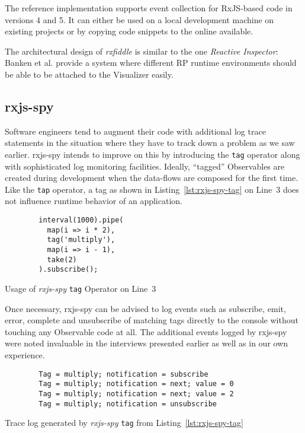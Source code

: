 \documentclass[12pt,a4paper]{article}
\begin{document}
The reference implementation supports event collection for RxJS-based code in versions 4 and 5. It can either be used on a local development machine on existing projects or by copying code snippets to the online available.

The architectural design of \emph{rxfiddle} is similar to the one \emph{Reactive Inspector}: Banken et al. provide a system where different RP runtime environments should be able to be attached to the Visualizer easily.

\subsection{rxjs-spy}

Software engineers tend to augment their code with additional log trace statements in the situation where they have to track down a problem as we saw earlier. rxjs-spy\cite{rxjsspy} intends to improve on this by introducing the \texttt{tag} operator along with sophisticated log monitoring facilities. Ideally, ``tagged'' Observables are created during development when the data-flows are composed for the first time. Like the \texttt{tap} operator, a tag as shown in Listing~\ref{lst:rxjs-spy-tag} on Line~3 does not influence runtime behavior of an application.

\begin{listing}[H]
	\begin{verbatim}
		interval(1000).pipe(
		  map(i => i * 2),
		  tag('multiply'),
		  map(i => i - 1),
		  take(2)
		).subscribe();
	\end{verbatim}
	\caption{Usage of \emph{rxjs-spy} \texttt{tag} Operator on Line~3}
	\label{lst:rxjs-spy-tag}
\end{listing}

Once necessary, rxjs-spy can be advised to log events such as subscribe, emit, error, complete and unsubscribe of matching tags directly to the console without touching any Observable code at all. The additional events logged by rxjs-spy were noted invaluable in the interviews presented earlier as well as in our own experience.

\begin{listing}[H]
	\begin{verbatim}
		Tag = multiply; notification = subscribe
		Tag = multiply; notification = next; value = 0
		Tag = multiply; notification = next; value = 2
		Tag = multiply; notification = unsubscribe
	\end{verbatim}
	\caption{Trace log generated by \emph{rxjs-spy} \texttt{tag} from Listing~\ref{lst:rxjs-spy-tag}}
	\label{lst:rxjs-spy-log}
\end{listing}
\end{document}
